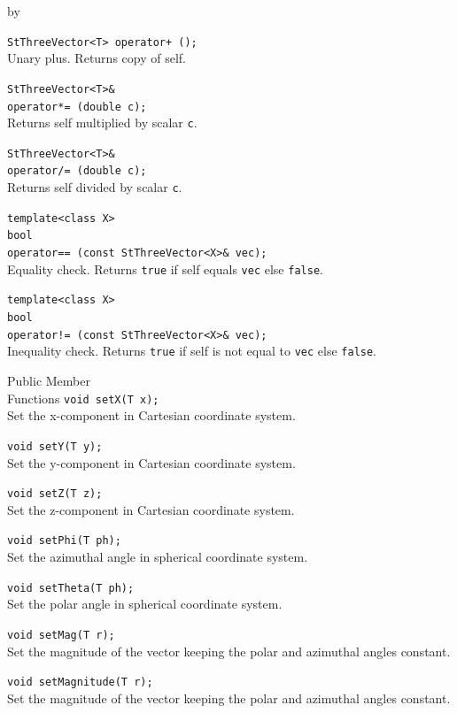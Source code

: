 \documentclass[twoside]{article}
\newcommand{\comp}[1]{\texttt{#1}}%
\newcommand{\entrylabel}[1]{\mbox{\textbf{{#1}}}\hfil}%
\newenvironment{entry}
{\begin{list}{}%
    {\renewcommand{\makelabel}{\entrylabel}%
     \setlength{\labelwidth}{90pt}%
     \setlength{\leftmargin}{\labelwidth}
     \advance\leftmargin by \labelsep%
      }%
    }%
  {\end{list}}
\newcommand{\Entrylabel}[1]%
{\raisebox{0pt}[1ex][0pt]{\makebox[\labelwidth][l]%
    {\parbox[t]{\labelwidth}{\hspace{0pt}\textbf{{#1}}}}}}
\newenvironment{Entry}%
{\renewcommand{\entrylabel}{\Entrylabel}\begin{entry}}%
  {\end{entry}}
\begin{document}
\begin{description}
\begin{Entry}
    \verb#StThreeVector<T> operator+ ();#\\
    Unary plus. Returns copy of self.
    
    \verb+StThreeVector<T>&+\\
    \verb+operator*= (double c);+\\
    Returns self multiplied by scalar \comp{c}.
    
    \verb+StThreeVector<T>&+\\
    \verb+operator/= (double c);+\\
    Returns self divided by scalar \comp{c}.
    
    \verb+template<class X>+\\
    \verb+bool+\\
    \verb+operator== (const StThreeVector<X>& vec);+\\
    Equality check. Returns \comp{true} if self equals
    \comp{vec} else \comp{false}.
    
    \verb+template<class X>+\\
    \verb+bool+\\
    \verb+operator!= (const StThreeVector<X>& vec);+\\
    Inequality check. Returns \comp{true} if self is not equal to
    \comp{vec} else \comp{false}.
    

\item[Public Member\\ Functions]
    \verb+void setX(T x);+\\
    Set the x-component in Cartesian coordinate system.
    
    \verb+void setY(T y);+\\
    Set the y-component in Cartesian coordinate system.
    
    \verb+void setZ(T z);+\\
    Set the z-component in Cartesian coordinate system.

    \verb+void setPhi(T ph);+\\
    Set the azimuthal angle in spherical coordinate system.

    \verb+void setTheta(T ph);+\\
    Set the polar angle in spherical coordinate system.

    \verb+void setMag(T r);+\\
    Set the magnitude of the vector keeping the polar and azimuthal
    angles constant.

    \verb+void setMagnitude(T r);+\\
    Set the magnitude of the vector keeping the polar and azimuthal
    angles constant.
    

\end{Entry}
\end{description}
\end{document}

